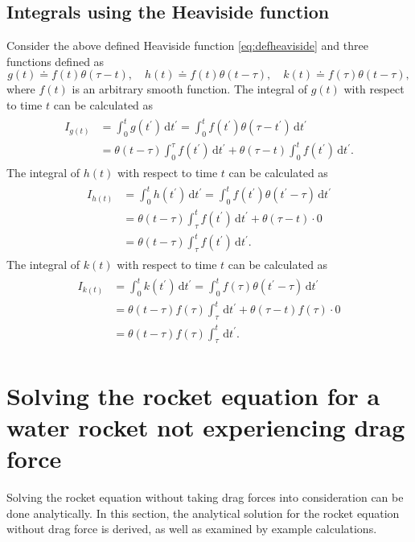 \documentclass[a4paper,11pt]{report}
\begin{document}
\subsection{Integrals using the Heaviside function}
Consider the above defined Heaviside function \cref{eq:defheaviside} and three functions defined as \begin{equation}
g(t)\doteq f(t)\theta(\tau-t), \quad h(t) \doteq f(t)\theta(t-\tau), \quad k(t) \doteq f(\tau)\theta(t-\tau),
\end{equation} where $f(t)$ is an arbitrary smooth function. The integral of $g(t)$ with respect to time $t$ can be calculated as \begin{align}\label{eq:heavisideintegrate_1}
\begin{aligned}
I_{g(t)} &= \int_{0}^{t}g(t^\prime)\,\mathrm{d}t^\prime = \int_{0}^{t} f(t^\prime)\theta(\tau-t^\prime)\,\mathrm{d}t^\prime \\
&= \theta(t-\tau)\int_{0}^{\tau}f(t^\prime)\,\mathrm{d}t^\prime + \theta(\tau-t)\int_{0}^{t}f(t^\prime)\,\mathrm{d}t^\prime.
\end{aligned}
\end{align} The integral of $h(t)$ with respect to time $t$ can be calculated as \begin{align}\label{eq:heavisideintegrate_2}
\begin{aligned}
I_{h(t)} &= \int_{0}^{t}h(t^\prime)\,\mathrm{d}t^\prime = \int_{0}^{t} f(t^\prime)\theta(t^\prime-\tau)\,\mathrm{d}t^\prime \\
&= \theta(t-\tau)\int_{\tau}^{t}f(t^\prime)\,\mathrm{d}t^\prime + \theta(\tau-t)\cdot 0 \\
&= \theta(t-\tau)\int_{\tau}^{t}f(t^\prime)\,\mathrm{d}t^\prime.
\end{aligned}
\end{align} The integral of $k(t)$ with respect to time $t$ can be calculated as \begin{align}\label{eq:heavisideintegrate_3}
\begin{aligned}
I_{k(t)} &= \int_{0}^{t}k(t^\prime)\,\mathrm{d}t^\prime = \int_{0}^{t} f(\tau)\theta(t^\prime-\tau)\,\mathrm{d}t^\prime \\
&= \theta(t-\tau)f(\tau)\int_{\tau}^{t}\,\mathrm{d}t^\prime + \theta(\tau-t)f(\tau)\cdot 0 \\
&= \theta(t-\tau)f(\tau)\int_{\tau}^{t}\,\mathrm{d}t^\prime.
\end{aligned}
\end{align}

\section{Solving the rocket equation for a water rocket not experiencing drag force}
Solving the rocket equation without taking drag forces into consideration can be done analytically. In this section, the analytical solution for the rocket equation without drag force is derived, as well as examined by example calculations.
\end{document}
